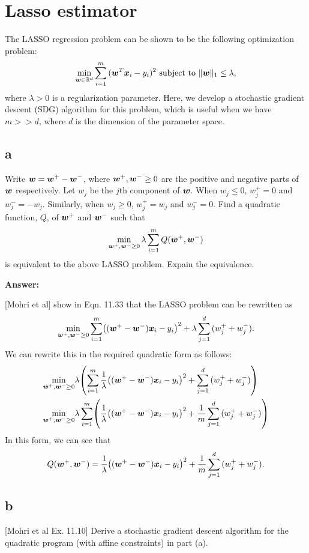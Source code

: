 \documentclass{article}
\begin{document}
\section{Lasso estimator}

The LASSO regression problem can be shown to be the following optimization problem:
$$\min_{\bm{w} \in \mathbb{R}^d}\sum_{i=1}^m{(\bm{w}^T\bm{x}_i - y_i)^2} \text{ subject to } \|\bm{w}\|_1 \leq \lambda,$$
where $\lambda > 0$ is a regularization parameter.
Here, we develop a stochastic gradient descent (SDG) algorithm for this problem, which is useful when we have $m >> d$, where $d$ is the dimension of the parameter space.

\subsection{a}
Write $\bm{w} = \bm{w}^{+} - \bm{w}^{-}$, where $\bm{w}^{+}, \bm{w}^{-} \geq 0$ are the positive and negative parts of $\bm{w}$ respectively.
Let $w_j$ be the $j$th component of $\bm{w}$.
When $w_j \leq 0$, $w_j^{+} = 0$ and $w_j^{-} = -w_j$.
Similarly, when $w_j \geq 0$, $w_j^{+} = w_j$ and $w_j^{-} = 0$.
Find a quadratic function, $Q$, of $\bm{w}^{+}$ and $\bm{w}^{-}$ such that
$$\min_{\bm{w}^{+},\bm{w}^{-} \geq 0}\lambda\sum_{i=1}^m{Q(\bm{w}^{+}, \bm{w}^{-})}$$
is equivalent to the above LASSO problem.
Expain the equivalence.

\textbf{Answer:}

[Mohri et al] show in Eqn. 11.33 that the LASSO problem can be rewritten as
$$\min_{\vct{w}^{+},\vct{w}^{-} \geq 0}\sum_{i=1}^{m}\left((\vct{w}^{+} - \vct{w}^{-})\vct{x}_i - y_i\right)^2 + \lambda\sum_{j=1}^d{(w_j^{+} + w_j^{-})}.$$
We can rewrite this in the required quadratic form as follows:
\begin{align*}
    \min_{\vct{w}^{+},\vct{w}^{-} \geq 0}&\lambda\left(\sum_{i=1}^{m}\frac{1}{\lambda}\left((\vct{w}^{+} - \vct{w}^{-})\vct{x}_i - y_i\right)^2 + \sum_{j=1}^d{(w_j^{+} + w_j^{-})}\right)\\
    \min_{\vct{w}^{+},\vct{w}^{-} \geq 0}&\lambda\sum_{i=1}^{m}\left(\frac{1}{\lambda}\left((\vct{w}^{+} - \vct{w}^{-})\vct{x}_i - y_i\right)^2 + \frac{1}{m}\sum_{j=1}^d{(w_j^{+} + w_j^{-})}\right)
\end{align*}
In this form, we can see that
$$Q(\vct{w}^{+}, \vct{w}^{-}) = \frac{1}{\lambda}\left((\vct{w}^{+} - \vct{w}^{-})\vct{x}_i - y_i\right)^2 + \frac{1}{m}\sum_{j=1}^d{(w_j^{+} + w_j^{-})}.$$

\subsection{b}
[Mohri et al Ex. 11.10] Derive a stochastic gradient descent algorithm for the quadratic program (with affine constraints) in part (a).
\end{document}

